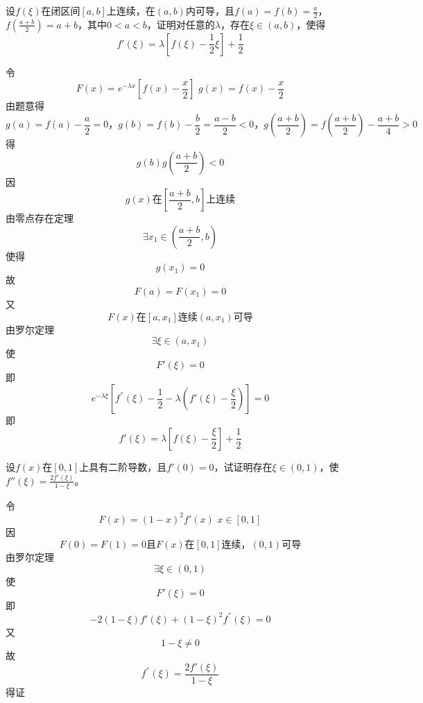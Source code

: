 \begin{example}
	设$f(\xi)$在闭区间$[a,b]$上连续，在$(a,b)$内可导，且$f(a)=f(b)=\frac{a}{2}$，$f(\frac{a+b}{2})=a+b$，其中$0<a<b$，证明对任意的$\lambda$，存在$\xi\in(a,b)$，使得\[f'(\xi)=\lambda\left[f(\xi)-\frac{1}{2}\xi\right]+\frac{1}{2}\]
\end{example}
	\begin{newproof}
		令\[F\left( x \right) =e^{-\lambda x}\left[ f\left( x \right) -\frac{x}{2} \right] \,\,   g\left( x \right) =f\left( x \right) -\frac{x}{2}\]
		由题意得\[g\left( a \right) =f\left( a \right) -\frac{a}{2}=0\text{，}g\left( b \right) =f\left( b \right) -\frac{b}{2}=\frac{a-b}{2}<0\text{，}g\left( \frac{a+b}{2} \right) =f\left( \frac{a+b}{2} \right) -\frac{a+b}{4}>0\]
		得\[g\left( b \right) g\left( \frac{a+b}{2} \right) <0\]
		因\[g\left( x \right) \text{在}\left[ \frac{a+b}{2},b \right] \text{上连续}\]
		由零点存在定理\[\exists x_1\in \left( \frac{a+b}{2},b \right) \]
		使得\[g\left( x_1 \right) =0\]
		故\[F\left( a \right) =F\left( x_1 \right) =0\]
		又\[F\left( x \right) \text{在}\left[ a,x_1 \right] \text{连续}\left( a,x_1 \right) \text{可导}\]
		由罗尔定理\[\exists \xi \in \left( a,x_1 \right) \]
		使\[F'\left( \xi \right) =0\]
		即\[e^{-\lambda \xi}\left[ f^{''}\left( \xi \right) -\frac{1}{2}-\lambda \left( f'\left( \xi \right) -\frac{\xi}{2} \right) \right] =0\]
		即\[f'\left( \xi \right) =\lambda \left[ f\left( \xi \right) -\frac{\xi}{2} \right] +\frac{1}{2}\]

	\end{newproof}
\begin{example}
	设$f(x)$在$[0,1]$上具有二阶导数，且$f'(0)=0$，试证明存在$\xi\in(0,1)$，使$f''(\xi)=\frac{2f'(\xi)}{1-\xi}$。
\end{example}
	\begin{newproof}
		令\[F\left( x \right) =\left( 1-x \right) ^2f'\left( x \right) \,\,   x\in \left[ 0,1 \right] \]
		因\[F\left( 0 \right) =F\left( 1 \right) =0\text{且}F\left( x \right) \text{在}\left[ 0,1 \right] \text{连续，}\left( 0,1 \right) \text{可导}\]
		由罗尔定理\[\exists \xi \in \left( 0,1 \right) \]
		使\[F'\left( \xi \right) =0\]
		即\[-2\left( 1-\xi \right) f'\left( \xi \right) +\left( 1-\xi \right) ^2f^{''}\left( \xi \right) =0\]
		又\[1-\xi \ne 0\]
		故\[f^{''}\left( \xi \right) =\frac{2f'\left( \xi \right)}{1-\xi}\]
		得证

	\end{newproof}

